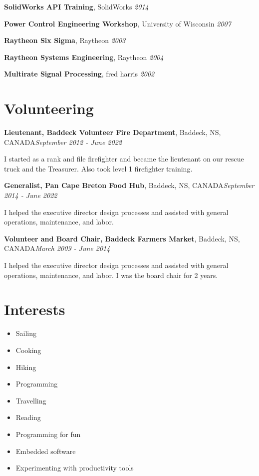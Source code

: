 \documentclass[letter,11pt]{article}
\newenvironment{noindentblock}{%
  \begin{list}{}{%
    \setlength{\leftmargin}{0in} %
    \setlength{\rightmargin}{.25in} %
    \setlength{\topsep}{0pt} %
    \setlength{\parsep}{0pt} %
  }
  \item[]}{\end{list}}
\begin{document}
\noindent
\textbf{SolidWorks API Training}, SolidWorks \hfill \textit{2014}

\noindent
\textbf{Power Control Engineering Workshop}, University of Wisconsin \hfill \textit{2007}

\noindent
\textbf{Raytheon Six Sigma}, Raytheon \hfill \textit{2003}

\noindent
\textbf{Raytheon Systems Engineering}, Raytheon \hfill \textit{2004}

\noindent
\textbf{Multirate Signal Processing}, fred harris \hfill \textit{2002}

\pagebreak
\section*{Volunteering}
\noindent
\textbf{Lieutenant, Baddeck Volunteer Fire Department}, Baddeck, NS, CANADA\hfill \textit{September 2012 - June 2022}
\begin{noindentblock}
  I started as a rank and file firefighter and became the lieutenant on our rescue truck and the Treasurer. Also took level 1 firefighter training.
\end{noindentblock}

\noindent
\textbf{Generalist, Pan Cape Breton Food Hub}, Baddeck, NS, CANADA\hfill \textit{September 2014 - June 2022}
\begin{noindentblock}
  I helped the executive director design processes and assisted with general operations, maintenance, and labor.
\end{noindentblock}

\noindent
\textbf{Volunteer and Board Chair, Baddeck Farmers Market}, Baddeck, NS, CANADA\hfill \textit{March 2009 - June 2014}
\begin{noindentblock}
  I helped the executive director design processes and assisted with general operations, maintenance, and labor. I was the board chair for 2 years.
\end{noindentblock}

\section*{Interests}
\begin{itemize}
\item Sailing
\item Cooking
\item Hiking
\item Programming
\item Travelling
\item Reading
\item Programming for fun
\item Embedded software
\item Experimenting with productivity tools
\end{itemize}
\end{document}
